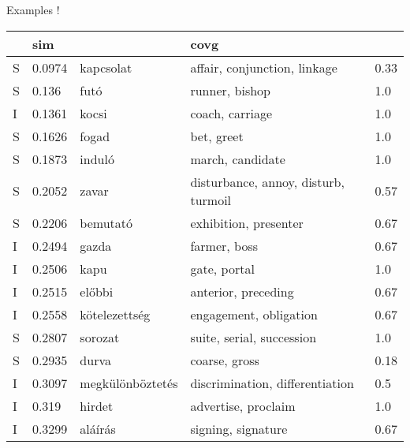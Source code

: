 \documentclass[10pt]{beamer}%
\begin{document}
\begin{frame}{Examples}
        \resizebox{\textwidth} {!} {%
  \begin{tabular}{lllll}
    \toprule
       & sim & & covg \\
    \midrule
      S	& 0.0974	& kapcsolat	& affair, conjunction, linkage	& 0.33 \\
      S	& 0.136	& futó	& runner, bishop	& 1.0 \\
      I	& 0.1361	& kocsi	& coach, carriage	& 1.0 \\
      S	& 0.1626	& fogad	& bet, greet	& 1.0 \\
      S	& 0.1873	& induló	& march, candidate	& 1.0 \\
      S	& 0.2052	& zavar	& disturbance, annoy, disturb, turmoil	& 0.57 \\
      S	& 0.2206	& bemutató	& exhibition, presenter	& 0.67 \\
      I	& 0.2494	& gazda	& farmer, boss	& 0.67 \\
      I	& 0.2506	& kapu	& gate, portal	& 1.0 \\
      I	& 0.2515	& előbbi	& anterior, preceding	& 0.67 \\
      I	& 0.2558	& kötelezettség	& engagement, obligation	& 0.67 \\
      S	& 0.2807	& sorozat	& suite, serial, succession	& 1.0 \\
      S	& 0.2935	& durva	& coarse, gross	& 0.18 \\
      I	& 0.3097	& megkülönböztetés	& discrimination, differentiation	& 0.5 \\
      I	& 0.319	& hirdet	& advertise, proclaim	& 1.0 \\
      I	& 0.3299	& aláírás	& signing, signature	& 0.67 \\
    \bottomrule
  \end{tabular}
  }
\end{frame}
\end{document}
